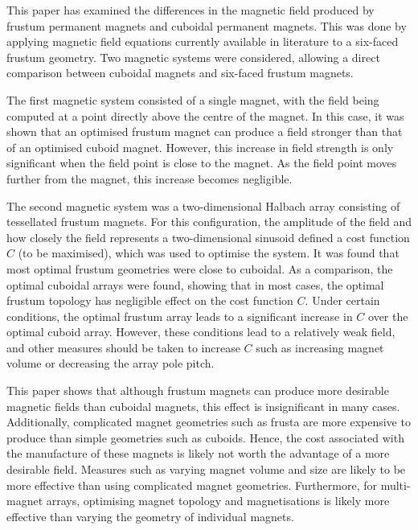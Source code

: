 This paper has examined the differences in the magnetic field produced by frustum permanent magnets and cuboidal permanent magnets. This was done by applying magnetic field equations currently available in literature \cite{OConnell2020a} to a six-faced frustum geometry. Two magnetic systems were considered, allowing a direct comparison between cuboidal magnets and six-faced frustum magnets.

The first magnetic system consisted of a single magnet, with the field being computed at a point directly above the centre of the magnet. In this case, it was shown that an optimised frustum magnet can produce a field stronger than that of an optimised cuboid magnet. However, this increase in field strength is only significant when the field point is close to the magnet. As the field point moves further from the magnet, this increase becomes negligible.

The second magnetic system was a two-dimensional Halbach array consisting of tessellated frustum magnets. For this configuration, the amplitude of the field and how closely the field represents a two-dimensional sinusoid defined a cost function \(C\) (to be maximised), which was used to optimise the system. It was found that most optimal frustum geometries were close to cuboidal. As a comparison, the optimal cuboidal arrays were found, showing that in most cases, the optimal frustum topology has negligible effect on the cost function \(C\). Under certain conditions, the optimal frustum array leads to a significant increase in \(C\) over the optimal cuboid array. However, these conditions lead to a relatively weak field, and other measures should be taken to increase \(C\) such as increasing magnet volume or decreasing the array pole pitch.

This paper shows that although frustum magnets can produce more desirable magnetic fields than cuboidal magnets, this effect is insignificant in many cases. Additionally, complicated magnet geometries such as frusta are more expensive to produce than simple geometries such as cuboids. Hence, the cost associated with the manufacture of these magnets is likely not worth the advantage of a more desirable field. Measures such as varying magnet volume and size are likely to be more effective than using complicated magnet geometries. Furthermore, for multi-magnet arrays, optimising magnet topology and magnetisations is likely more effective than varying the geometry of individual magnets.